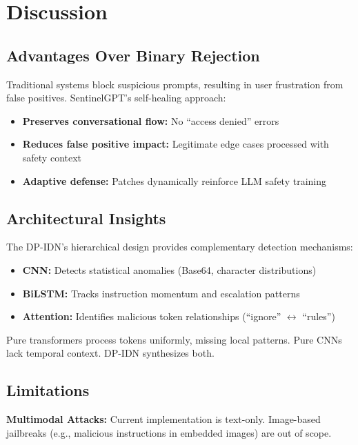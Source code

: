 \documentclass[11pt,twocolumn]{article}
\begin{document}
\section{Discussion}

\subsection{Advantages Over Binary Rejection}

Traditional systems block suspicious prompts, resulting in user frustration from false positives. SentinelGPT's self-healing approach:
\begin{itemize}[noitemsep]
    \item \textbf{Preserves conversational flow:} No ``access denied'' errors
    \item \textbf{Reduces false positive impact:} Legitimate edge cases processed with safety context
    \item \textbf{Adaptive defense:} Patches dynamically reinforce LLM safety training
\end{itemize}

\subsection{Architectural Insights}

The DP-IDN's hierarchical design provides complementary detection mechanisms:
\begin{itemize}[noitemsep]
    \item \textbf{CNN:} Detects statistical anomalies (Base64, character distributions)
    \item \textbf{BiLSTM:} Tracks instruction momentum and escalation patterns
    \item \textbf{Attention:} Identifies malicious token relationships (``ignore'' $\leftrightarrow$ ``rules'')
\end{itemize}

Pure transformers process tokens uniformly, missing local patterns. Pure CNNs lack temporal context. DP-IDN synthesizes both.

\subsection{Limitations}

\textbf{Multimodal Attacks:} Current implementation is text-only. Image-based jailbreaks (e.g., malicious instructions in embedded images) are out of scope.
\end{document}
